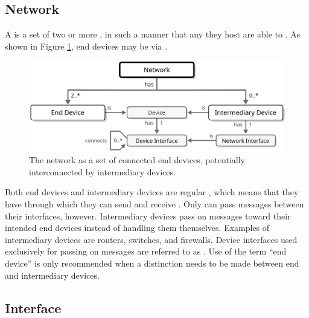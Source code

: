 \subsection{Network}
\label{sec:concepts:network}

A  is a set of two or more ,  in such a manner that any  they host are able to .
As shown in Figure \ref{fig:network}, end devices may be  via .

\begin{figure}[ht!]
  \centering
  \includegraphics[scale=0.9]{figures/network}
  \caption{
    The network as a set of connected end devices, potentially interconnected by intermediary devices.
  }
  \label{fig:network}
\end{figure}

Both end devices and intermediary devices are regular , which means that they have  through which they can send and receive .
Only  can pass messages between their interfaces, however.
Intermediary devices pass on messages toward their intended end devices instead of handling them themselves.
Examples of intermediary devices are routers, switches, and firewalls.
Device interfaces used exclusively for passing on messages are referred to as .
Use of the term ``end device'' is only recommended when a distinction needs to be made between end and intermediary devices.

\subsection{Interface}
\label{sec:concepts:interface}

